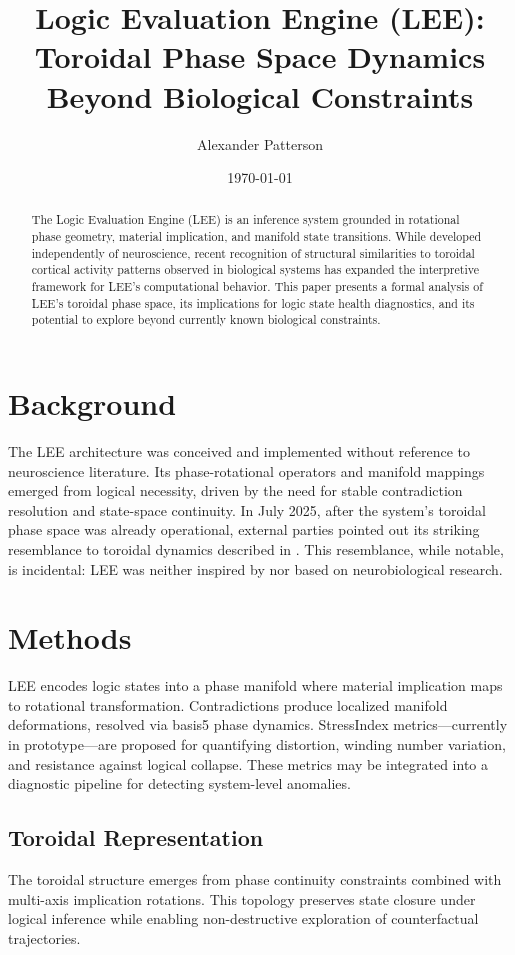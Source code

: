 \documentclass[12pt]{article}
\title{Logic Evaluation Engine (LEE): Toroidal Phase Space Dynamics Beyond Biological Constraints}
\author{Alexander Patterson}
\date{\today}
\begin{document}
\maketitle

\begin{abstract}
The Logic Evaluation Engine (LEE) is an inference system grounded in rotational phase geometry, material implication, and manifold state transitions. While developed independently of neuroscience, recent recognition of structural similarities to toroidal cortical activity patterns observed in biological systems has expanded the interpretive framework for LEE's computational behavior. This paper presents a formal analysis of LEE's toroidal phase space, its implications for logic state health diagnostics, and its potential to explore beyond currently known biological constraints.
\end{abstract}

\section{Background}
The LEE architecture was conceived and implemented without reference to neuroscience literature. Its phase-rotational operators and manifold mappings emerged from logical necessity, driven by the need for stable contradiction resolution and state-space continuity. In July 2025, after the system's toroidal phase space was already operational, external parties pointed out its striking resemblance to toroidal dynamics described in \citep{cortical2011, cortical2024}. This resemblance, while notable, is incidental: LEE was neither inspired by nor based on neurobiological research.

\section{Methods}
LEE encodes logic states into a phase manifold where material implication maps to rotational transformation. Contradictions produce localized manifold deformations, resolved via basis5 phase dynamics. StressIndex metrics---currently in prototype---are proposed for quantifying distortion, winding number variation, and resistance against logical collapse. These metrics may be integrated into a diagnostic pipeline for detecting system-level anomalies.

\subsection{Toroidal Representation}
The toroidal structure emerges from phase continuity constraints combined with multi-axis implication rotations. This topology preserves state closure under logical inference while enabling non-destructive exploration of counterfactual trajectories.
\end{document}
